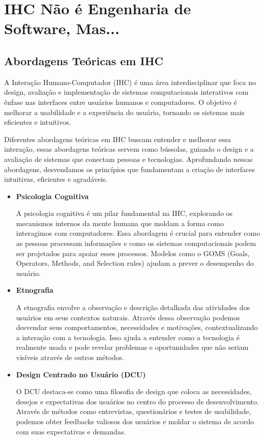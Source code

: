 \documentclass[
  12pt,
  openright,
  twoside,
  a4paper,
  english,
  french,
  spanish,
  brazil
]{abntex2}
\begin{document}
\chapter{IHC Não é Engenharia de Software, Mas...}

\section{Abordagens Teóricas em IHC}

A Interação Humano-Computador (IHC) é uma área interdisciplinar que foca no
design, avaliação e implementação de sistemas computacionais interativos com
ênfase nas interfaces entre usuários humanos e computadores. O objetivo é
melhorar a usabilidade e a experiência do usuário, tornando os sistemas mais
eficientes e intuitivos.

Diferentes abordagens teóricas em IHC buscam entender e melhorar essa interação,
essas abordagens teóricas servem como bússolas, guiando o design e a avaliação
de sistemas que conectam pessoas e tecnologias. Aprofundando nessas abordagens,
desvendamos os princípios que fundamentam a criação de interfaces intuitivas,
eficientes e agradáveis.

\begin{itemize}
  \item \textbf{Psicologia Cognitiva}

    A psicologia cognitiva é um pilar fundamental na IHC, explorando os
    mecanismos internos da mente humana que moldam a forma como interagimos com
    computadores. Essa abordagem é crucial para entender como as pessoas
    processam informações e como os sistemas computacionais podem ser projetados
    para apoiar esses processos. Modelos como o GOMS (Goals, Operators, Methods,
    and Selection rules) ajudam a prever o desempenho do usuário.

  \item \textbf{Etnografia}

    A etnografia envolve a observação e descrição detalhada das atividades dos
    usuários em seus contextos naturais. Através dessa observação podemos
    desvendar seus comportamentos, necessidades e motivações, contextualizando a
    interação com a tecnologia. Isso ajuda a entender como a tecnologia é
    realmente usada e pode revelar problemas e oportunidades que não seriam
    visíveis através de outros métodos.

  \newpage

  \item \textbf{Design Centrado no Usuário (DCU)}

    O DCU destaca-se como uma filosofia de design que coloca as necessidades,
    desejos e expectativas dos usuários no centro do processo de
    desenvolvimento. Através de métodos como entrevistas, questionários e testes
    de usabilidade, podemos obter feedbacks valiosos dos usuários e moldar o
    sistema de acordo com suas expectativas e demandas.
\end{itemize}
\end{document}
